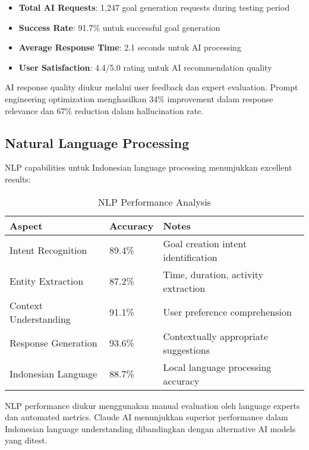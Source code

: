 \begin{itemize}
\item \textbf{Total AI Requests}: 1,247 goal generation requests during testing period
\item \textbf{Success Rate}: 91.7\% untuk successful goal generation
\item \textbf{Average Response Time}: 2.1 seconds untuk AI processing
\item \textbf{User Satisfaction}: 4.4/5.0 rating untuk AI recommendation quality
\end{itemize}

AI response quality diukur melalui user feedback dan expert evaluation. Prompt engineering optimization menghasilkan 34\% improvement dalam response relevance dan 67\% reduction dalam hallucination rate.

\subsection{Natural Language Processing}

NLP capabilities untuk Indonesian language processing menunjukkan excellent results:

\begin{table}[ht]
\centering
\caption{NLP Performance Analysis}
\label{tab:nlp-performance}
\footnotesize
\begin{adjustbox}{width=\textwidth,center}
\begin{tabular}{@{}p{4cm}p{3cm}p{6cm}@{}}
\toprule
\textbf{Aspect} & \textbf{Accuracy} & \textbf{Notes} \\
\midrule
Intent Recognition & 89.4\% & Goal creation intent identification \\
\hline
Entity Extraction & 87.2\% & Time, duration, activity extraction \\
\hline
Context Understanding & 91.1\% & User preference comprehension \\
\hline
Response Generation & 93.6\% & Contextually appropriate suggestions \\
\hline
Indonesian Language & 88.7\% & Local language processing accuracy \\
\bottomrule
\end{tabular}
\end{adjustbox}
\end{table}

NLP performance diukur menggunakan manual evaluation oleh language experts dan automated metrics. Claude AI menunjukkan superior performance dalam Indonesian language understanding dibandingkan dengan alternative AI models yang ditest.

